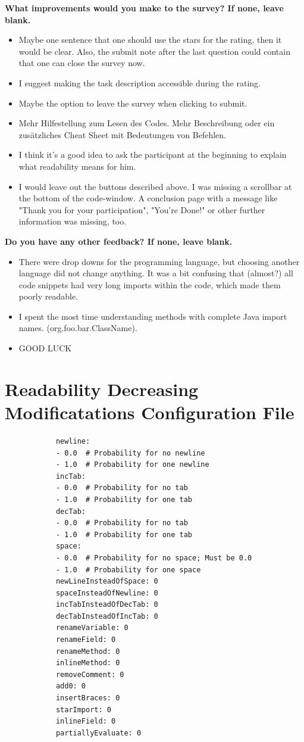 \documentclass[%
class=scrreprt,
chapterprefix=false,%
open=right,%
twoside=false,%
paper=a4,%
logofile={Logo\_zentral\_farbig\_EN.png},%
thesistype=master,%
UKenglish,%
]{se2thesis}
\theoremstyle{definition}
\newcommand{\RDMs}{Readability Decreasing Modificatations\xspace}
\begin{document}
	\textbf{What improvements would you make to the survey? If none, leave blank.}
	\begin{itemize}
		\item Maybe one sentence that one should use the stars for the rating, then it would be clear. Also, the submit note after the last question could contain that one can close the survey now.
		\item I suggest making the task description accessible during the rating.
		\item Maybe the option to leave the survey when clicking to submit.
		\item Mehr Hilfestellung zum Lesen des Codes. Mehr Beschreibung oder ein zusätzliches Cheat Sheet mit Bedeutungen von Befehlen.
		\item I think it's a good idea to ask the participant at the beginning to explain what readability means for him.
		\item I would leave out the buttons described above. I was missing a scrollbar at the bottom of the code-window. A conclusion page with a message like "Thank you for your participation", "You're Done!" or other further information was missing, too.
	\end{itemize}
	
	\textbf{Do you have any other feedback? If none, leave blank.}
	\begin{itemize}
		\item There were drop downs for the programming language, but choosing another language did not change anything. It was a bit confusing that (almost?) all code snippets had very long imports within the code, which made them poorly readable.
		\item I spent the most time understanding methods with complete Java import names. (org.foo.bar.ClassName).
		\item GOOD LUCK
	\end{itemize}
	
\pagebreak
\section{\RDMs Configuration File}\label{appendix:rdh-config-file}
	\begin{listing}[h!]
		\begin{verbatim}
			newline:
			- 0.0  # Probability for no newline
			- 1.0  # Probability for one newline
			incTab:
			- 0.0  # Probability for no tab
			- 1.0  # Probability for one tab
			decTab:
			- 0.0  # Probability for no tab
			- 1.0  # Probability for one tab
			space:
			- 0.0  # Probability for no space; Must be 0.0
			- 1.0  # Probability for one space
			newLineInsteadOfSpace: 0
			spaceInsteadOfNewline: 0
			incTabInsteadOfDecTab: 0
			decTabInsteadOfIncTab: 0
			renameVariable: 0
			renameField: 0
			renameMethod: 0
			inlineMethod: 0
			removeComment: 0
			add0: 0
			insertBraces: 0
			starImport: 0
			inlineField: 0
			partiallyEvaluate: 0
		\end{verbatim}
		\label{lst:rdh-config-file}
	\end{listing}
	
\end{document}
